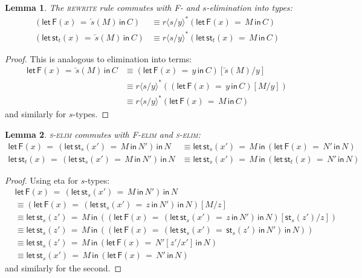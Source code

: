 \documentclass[10pt]{article}
\newtheorem{lemma}{Lemma}
\theoremstyle{definition}
\newcommand{\rewrite}[2]{\overleftarrow{#1}(#2)}
\newcommand\St[2]{\ensuremath{{#1}^*(#2)}}
\newcommand\StI[2]{\ensuremath{\mathsf{st}_{#1}(#2)}}
\newcommand\StE[4]{\ensuremath{\mathsf{let} \, \StI{#1}{#3} \, = \, {#2} \, \mathsf{in} \, #4}}
\newcommand\FE[3]{\ensuremath{\mathsf{let} \, \mathsf{F}(#2) \, = \, {#1} \, \mathsf{in} \, #3}}
\newcommand\ap[2]{\ensuremath{#1 \langle #2 \rangle }}
\begin{document}
\begin{lemma}
The \textsc{rewrite} rule commutes with \textsf{F}- and $s$-elimination into types:
\begin{align*}
(\FE{\rewrite{s}{M}}{x}{C}) &\equiv \St{\ap{r}{s/y}}{\FE{M}{x}{C}} \\
(\StE{t}{\rewrite{s}{M}}{x}{C}) &\equiv \St{\ap{r}{s/y}}{\StE{t}{M}{x}{C}}
\end{align*}
\end{lemma}
\begin{proof}
This is analogous to elimination into terms:
\begin{align*}
\FE{\rewrite{s}{M}}{x}{C}
&\equiv (\FE{y}{x}{C})[\rewrite{s}{M}/y] \\
&\equiv \St{\ap{r}{s/y}}{(\FE{y}{x}{C})[M/y]} \\
&\equiv \St{\ap{r}{s/y}}{\FE{M}{x}{C}}
\end{align*}
and similarly for $s$-types.
\end{proof}

\begin{lemma}\label{lem:s-elim-s-elim}
\textsc{s-elim} commutes with \textsc{F-elim} and \textsc{s-elim}:
\begin{align*}
\FE{(\StE{s}{M}{x'}{N'})}{x}{N} &\equiv \StE{s}{M}{x'}{(\FE{N'}{x}{N})} \\
\StE{t}{(\StE{s}{M}{x'}{N'})}{x}{N} &\equiv \StE{s}{M}{x'}{(\StE{t}{N'}{x}{N})}
\end{align*}
\end{lemma}
\begin{proof}
Using eta for $s$-types:
\begin{align*}
&\FE{(\StE{s}{M}{x'}{N'})}{x}{N} \\
&\equiv (\FE{(\StE{s}{z}{x'}{N'})}{x}{N})[M/z] \\
&\equiv \StE{s}{M}{z'}{((\FE{(\StE{s}{z}{x'}{N'})}{x}{N})[\StI{s}{z'}/z])} \\
&\equiv \StE{s}{M}{z'}{((\FE{(\StE{s}{\StI{s}{z'}}{x'}{N'})}{x}{N}))} \\
&\equiv \StE{s}{M}{z'}{(\FE{N'[z'/x']}{x}{N})} \\
&\equiv \StE{s}{M}{x'}{(\FE{N'}{x}{N})}
\end{align*}
and similarly for the second.
\end{proof}
\end{document}
